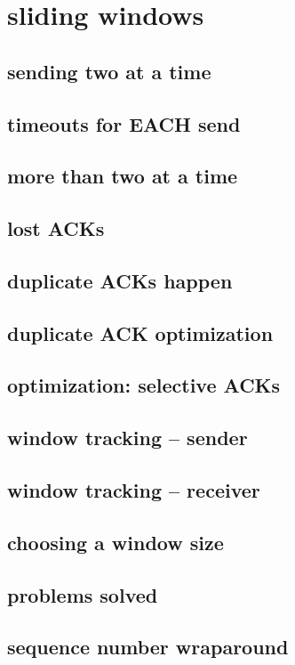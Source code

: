 \section{sliding windows}

\subsection{sending two at a time}


\subsection{timeouts for EACH send}


\subsection{more than two at a time}


\subsection{lost ACKs}


\subsection{duplicate ACKs happen}


\subsection{duplicate ACK optimization}


\subsection{optimization: selective ACKs}


\subsection{window tracking -- sender}


\subsection{window tracking -- receiver}


\subsection{choosing a window size}


\subsection{problems solved}


\subsection{sequence number wraparound}


